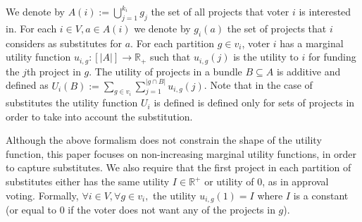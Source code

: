 \documentclass[runningheads]{llncs}
\newcommand{\kibitz}[2]{\ifnum\Comments=1{\color{#1}{#2}}\fi}
\newcommand{\rf}[1]{\kibitz{blue}{[Roy says:#1]}}
\begin{document}
We denote by $A(i):=\bigcup_{j=1}^{k_i}g_j$ the set of all projects that voter $i$ is interested in. 
 For each $i\in V, a\in A(i)$ we denote by $g_i(a)$ the set of projects that $i$ considers as substitutes for $a$.
 For each partition  $g\in v_i$,   voter $i$ has a marginal utility function $u_{i,g}:[|A|]\rightarrow \mathbb{R}_+$  
such that $u_{i,g}(j)$ is the utility to $i$ for funding the $j$th project in $g$. 
The utility of projects in a bundle $B\subseteq A$ is additive and defined as 
$U_i(B):=\sum_{g\in{v_i}}\sum_{j=1}^{|g\cap B|}u_{i,g}(j)$. \rf{Added this sentence to make clear that $U_i$ have different meaning with substitutes}Note that in the case of substitutes the utility function $U_i$ is defined is defined only for sets of projects in order to take into account the substitution.  
 
 Although the  above formalism does not constrain the shape of the utility function, this paper  focuses  on non-increasing marginal utility functions, in order to capture   substitutes.
We also  require that  the first project in each partition of substitutes either has the same utility $I\in \mathbb{R}^+$ or utility of 0, as in approval voting. Formally,   $\forall i\in V, \forall g\in v_i,$ the utility $u_{i,g}(1)=I$ where $I$ is a constant (or equal to 0 if the voter does not want any of the projects in $g$). 
\end{document}
